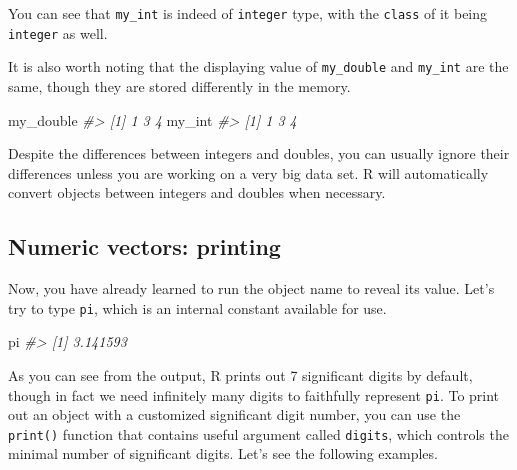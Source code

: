 \documentclass[
]{book}
\newenvironment{Shaded}{\begin{snugshade}}{\end{snugshade}}
\newcommand{\CommentTok}[1]{\textcolor[rgb]{0.56,0.35,0.01}{\textit{#1}}}
\newcommand{\NormalTok}[1]{#1}
\newenvironment{blackbox}{
  \definecolor{shadecolor}{rgb}{0, 0, 0}  %
  \color{white}
  \begin{shaded}}
 {\end{shaded}}
\newenvironment{infobox}[1]
  {
  \begin{itemize}
  \renewcommand{\labelitemi}{
    \raisebox{-.7\height}[0pt][0pt]{
      {\setkeys{Gin}{width=3em,keepaspectratio}
        \texttt{[image: pics/\#1]}}
    }
  }
  \setlength{\fboxsep}{1em}
  \begin{blackbox}
  \item
  }
  {
  \end{blackbox}
  \end{itemize}
  }
\begin{document}
You can see that \texttt{my\_int} is indeed of \texttt{integer} type, with the \texttt{class} of it being \texttt{integer} as well.

It is also worth noting that the displaying value of \texttt{my\_double} and \texttt{my\_int} are the same, though they are stored differently in the memory.

\begin{Shaded}
\begin{Highlighting}[]
\NormalTok{my\_double}
\CommentTok{\#\textgreater{} [1] 1 3 4}
\NormalTok{my\_int}
\CommentTok{\#\textgreater{} [1] 1 3 4}
\end{Highlighting}
\end{Shaded}

\begin{infobox}{caution}
Despite the differences between integers and doubles, you can usually ignore their differences unless you are working on a very big data set. R will automatically convert objects between integers and doubles when necessary.

\end{infobox}

\hypertarget{numeric-vectors-printing}{%
\subsection{Numeric vectors: printing}\label{numeric-vectors-printing}}

Now, you have already learned to run the object name to reveal its value. Let's try to type \texttt{pi}, which is an internal constant available for use.

\begin{Shaded}
\begin{Highlighting}[]
\NormalTok{pi}
\CommentTok{\#\textgreater{} [1] 3.141593}
\end{Highlighting}
\end{Shaded}

As you can see from the output, R prints out 7 significant digits by default, though in fact we need infinitely many digits to faithfully represent \texttt{pi}. To print out an object with a customized significant digit number, you can use the \texttt{print()} function that contains useful argument called \texttt{digits}, which controls the minimal number of significant digits. Let's see the following examples.
\end{document}
